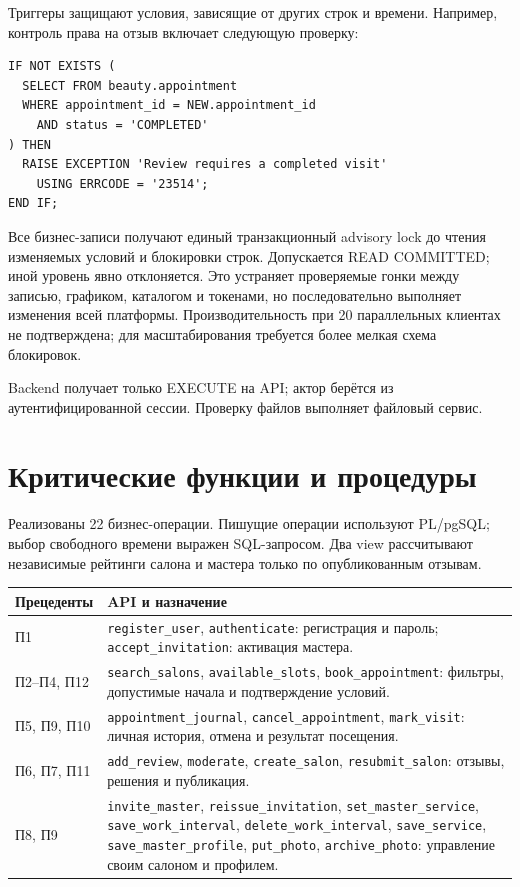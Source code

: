 \documentclass[11pt,a4paper]{article}
\begin{document}
Триггеры защищают условия, зависящие от других строк и времени. Например, контроль права на отзыв включает следующую проверку:


\begin{lstlisting}[style=sql]
IF NOT EXISTS (
  SELECT FROM beauty.appointment
  WHERE appointment_id = NEW.appointment_id
    AND status = 'COMPLETED'
) THEN
  RAISE EXCEPTION 'Review requires a completed visit'
    USING ERRCODE = '23514';
END IF;
\end{lstlisting}


Все бизнес-записи получают единый транзакционный advisory lock до чтения изменяемых условий и блокировки строк. Допускается READ COMMITTED; иной уровень явно отклоняется. Это устраняет проверяемые гонки между записью, графиком, каталогом и токенами, но последовательно выполняет изменения всей платформы. Производительность при 20 параллельных клиентах не подтверждена; для масштабирования требуется более мелкая схема блокировок.

Backend получает только EXECUTE на API; актор берётся из аутентифицированной сессии. Проверку файлов выполняет файловый сервис.

\section{Критические функции и процедуры}
Реализованы 22 бизнес-операции. Пишущие операции используют PL/pgSQL; выбор свободного времени выражен SQL-запросом. Два view рассчитывают независимые рейтинги салона и мастера только по опубликованным отзывам.


\begin{longtable}{L{2.8cm}L{13.3cm}}
\toprule Прецеденты & API и назначение\\\midrule\endhead
П1 & \texttt{register\_\allowbreak{}user}, \texttt{authenticate}: регистрация и пароль; \texttt{accept\_\allowbreak{}invitation}: активация мастера.\\
П2--П4, П12 & \texttt{search\_\allowbreak{}salons}, \texttt{available\_\allowbreak{}slots}, \texttt{book\_\allowbreak{}appointment}: фильтры, допустимые начала и подтверждение условий.\\
П5, П9, П10 & \texttt{appointment\_\allowbreak{}journal}, \texttt{cancel\_\allowbreak{}appointment}, \texttt{mark\_\allowbreak{}visit}: личная история, отмена и результат посещения.\\
П6, П7, П11 & \texttt{add\_\allowbreak{}review}, \texttt{moderate}, \texttt{create\_\allowbreak{}salon}, \texttt{resubmit\_\allowbreak{}salon}: отзывы, решения и публикация.\\
П8, П9 & \texttt{invite\_\allowbreak{}master}, \texttt{reissue\_\allowbreak{}invitation}, \texttt{set\_\allowbreak{}master\_\allowbreak{}service}, \texttt{save\_\allowbreak{}work\_\allowbreak{}interval}, \texttt{delete\_\allowbreak{}work\_\allowbreak{}interval}, \texttt{save\_\allowbreak{}service}, \texttt{save\_\allowbreak{}master\_\allowbreak{}profile}, \texttt{put\_\allowbreak{}photo}, \texttt{archive\_\allowbreak{}photo}: управление своим салоном и профилем.\\
\bottomrule\end{longtable}
\end{document}
